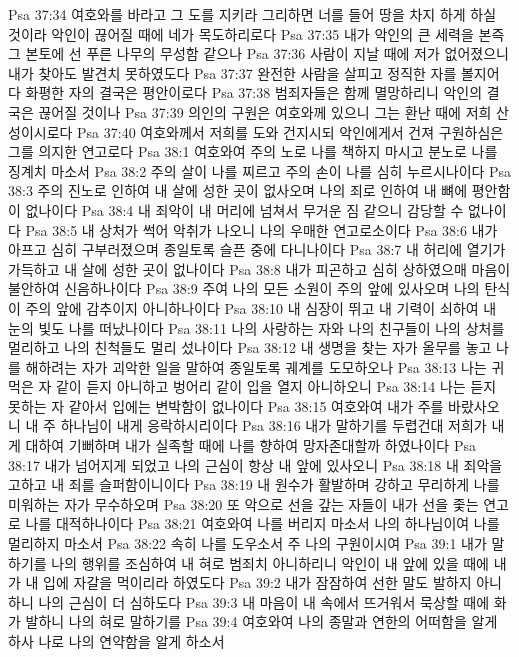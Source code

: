 Psa 37:34  여호와를 바라고 그 도를 지키라 그리하면 너를 들어 땅을 차지 하게 하실 것이라 악인이 끊어질 때에 네가 목도하리로다
Psa 37:35  내가 악인의 큰 세력을 본즉 그 본토에 선 푸른 나무의 무성함 같으나
Psa 37:36  사람이 지날 때에 저가 없어졌으니 내가 찾아도 발견치 못하였도다
Psa 37:37  완전한 사람을 살피고 정직한 자를 볼지어다 화평한 자의 결국은 평안이로다
Psa 37:38  범죄자들은 함께 멸망하리니 악인의 결국은 끊어질 것이나
Psa 37:39  의인의 구원은 여호와께 있으니 그는 환난 때에 저희 산성이시로다
Psa 37:40  여호와께서 저희를 도와 건지시되 악인에게서 건져 구원하심은 그를 의지한 연고로다
Psa 38:1  여호와여 주의 노로 나를 책하지 마시고 분노로 나를 징계치 마소서
Psa 38:2  주의 살이 나를 찌르고 주의 손이 나를 심히 누르시나이다
Psa 38:3  주의 진노로 인하여 내 살에 성한 곳이 없사오며 나의 죄로 인하여 내 뼈에 평안함이 없나이다
Psa 38:4  내 죄악이 내 머리에 넘쳐서 무거운 짐 같으니 감당할 수 없나이다
Psa 38:5  내 상처가 썩어 악취가 나오니 나의 우매한 연고로소이다
Psa 38:6  내가 아프고 심히 구부러졌으며 종일토록 슬픈 중에 다니나이다
Psa 38:7  내 허리에 열기가 가득하고 내 살에 성한 곳이 없나이다
Psa 38:8  내가 피곤하고 심히 상하였으매 마음이 불안하여 신음하나이다
Psa 38:9  주여 나의 모든 소원이 주의 앞에 있사오며 나의 탄식이 주의 앞에 감추이지 아니하나이다
Psa 38:10  내 심장이 뛰고 내 기력이 쇠하여 내 눈의 빛도 나를 떠났나이다
Psa 38:11  나의 사랑하는 자와 나의 친구들이 나의 상처를 멀리하고 나의 친척들도 멀리 섰나이다
Psa 38:12  내 생명을 찾는 자가 올무를 놓고 나를 해하려는 자가 괴악한 일을 말하여 종일토록 궤계를 도모하오나
Psa 38:13  나는 귀먹은 자 같이 듣지 아니하고 벙어리 같이 입을 열지 아니하오니
Psa 38:14  나는 듣지 못하는 자 같아서 입에는 변박함이 없나이다
Psa 38:15  여호와여 내가 주를 바랐사오니 내 주 하나님이 내게 응락하시리이다
Psa 38:16  내가 말하기를 두렵건대 저희가 내게 대하여 기뻐하며 내가 실족할 때에 나를 향하여 망자존대할까 하였나이다
Psa 38:17  내가 넘어지게 되었고 나의 근심이 항상 내 앞에 있사오니
Psa 38:18  내 죄악을 고하고 내 죄를 슬퍼함이니이다
Psa 38:19  내 원수가 활발하며 강하고 무리하게 나를 미워하는 자가 무수하오며
Psa 38:20  또 악으로 선을 갚는 자들이 내가 선을 좇는 연고로 나를 대적하나이다
Psa 38:21  여호와여 나를 버리지 마소서 나의 하나님이여 나를 멀리하지 마소서
Psa 38:22  속히 나를 도우소서 주 나의 구원이시여
Psa 39:1  내가 말하기를 나의 행위를 조심하여 내 혀로 범죄치 아니하리니 악인이 내 앞에 있을 때에 내가 내 입에 자갈을 먹이리라 하였도다
Psa 39:2  내가 잠잠하여 선한 말도 발하지 아니하니 나의 근심이 더 심하도다
Psa 39:3  내 마음이 내 속에서 뜨거워서 묵상할 때에 화가 발하니 나의 혀로 말하기를
Psa 39:4  여호와여 나의 종말과 연한의 어떠함을 알게 하사 나로 나의 연약함을 알게 하소서
